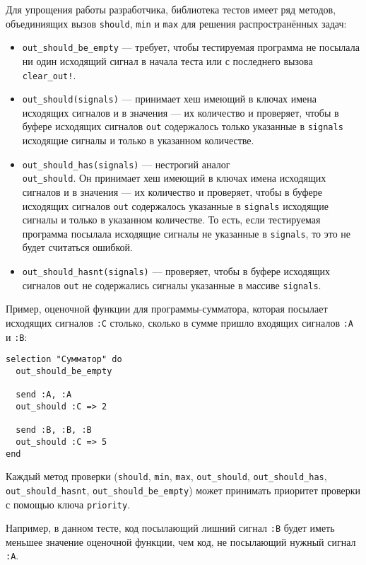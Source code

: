 \documentclass[utf8,a5paper,portrait,12pt]{eskdtext}
\begin{document}
Для упрощения работы разработчика, библиотека тестов имеет ряд методов,
объединиящих вызов \texttt{should}, \texttt{min} и \texttt{max} для решения
распространённых задач:
\begin{itemize}
  \item \texttt{out\_should\_be\_empty} — требует, чтобы тестируемая программа
        не посылала ни один исходящий сигнал в начала теста или с последнего
        вызова \texttt{clear\_out!}.
  \item \texttt{out\_should(signals)} — принимает хеш имеющий в ключах имена
        исходящих сигналов и в значения — их количество и проверяет, чтобы
        в буфере исходящих сигналов \texttt{out} содержалось только указанные в
        \texttt{signals} исходящие сигналы и только в указанном количестве.
  \item \texttt{out\_should\_has(signals)} — нестрогий аналог\\
        \texttt{out\_should}. Он принимает хеш имеющий в ключах имена
        исходящих сигналов и в значения — их количество и проверяет, чтобы
        в буфере исходящих сигналов \texttt{out} содержалось указанные в
        \texttt{signals} исходящие сигналы и только в указанном количестве.
        То есть, если тестируемая программа посылала исходящие сигналы не
        указанные в \texttt{signals}, то это не будет считаться ошибкой.
  \item \texttt{out\_should\_hasnt(signals)} — проверяет, чтобы в буфере
        исходящих сигналов \texttt{out} не содержались сигналы указанные в
        массиве \texttt{signals}.
\end{itemize}

Пример, оценочной функции для программы-сумматора, которая посылает исходящих
сигналов \texttt{:C} столько, сколько в сумме пришло входящих сигналов
\texttt{:A} и \texttt{:B}:

\begin{verbatim}
selection "Сумматор" do
  out_should_be_empty
  
  send :A, :A
  out_should :C => 2
  
  send :B, :B, :B
  out_should :C => 5
end
\end{verbatim}

Каждый метод проверки (\texttt{should}, \texttt{min}, \texttt{max},
\texttt{out\_should}, \texttt{out\_should\_has}, \texttt{out\_should\_hasnt},
\texttt{out\_should\_be\_empty}) может принимать приоритет проверки с помощью
ключа \texttt{priority}.

Например, в данном тесте, код посылающий лишний сигнал \texttt{:B} будет иметь
меньшее значение оценочной функции, чем код, не посылающий нужный сигнал
\texttt{:A}.
\end{document}
